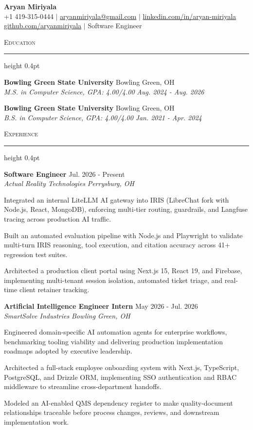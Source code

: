 \documentclass[letterpaper,11pt]{article}
\newcommand{\resumesection}[1]{%
  \par\vspace{2pt}%
  {\large\scshape #1}\par\vspace{2pt}%
  \hrule height 0.4pt\vspace{2pt}%
}
\newcommand{\resumeSubheading}[4]{
  \textbf{#1} \hfill #2\\
  \textit{#3} \hfill \textit{#4}
}
\begin{document}
\begin{center}
  {\LARGE \textbf{Aryan Miriyala}}\\[2pt]
  \small
  +1 419-315-0444 $|$ \href{mailto:aryanmiriyala@gmail.com}{aryanmiriyala@gmail.com} $|$ \href{https://www.linkedin.com/in/aryan-miriyala-7788a21b6/}{linkedin.com/in/aryan-miriyala}\\
  \href{https://github.com/aryanmiriyala}{github.com/aryanmiriyala} $|$ Software Engineer
\end{center}\vspace{-6pt}

\resumesection{Education}
\resumeSubheading
{Bowling Green State University}{Bowling Green, OH}
{M.S. in Computer Science, GPA: 4.00/4.00}{Aug. 2024 - Aug. 2026}

\resumeSubheading
{Bowling Green State University}{Bowling Green, OH}
{B.S. in Computer Science, GPA: 4.00/4.00}{Jan. 2021 - Apr. 2024}

\resumesection{Experience}
\resumeSubheading
{Software Engineer}{Jul. 2026 - Present}
{Actual Reality Technologies}{Perrysburg, OH}
\begin{tightitemize}
  \item Integrated an internal LiteLLM AI gateway into IRIS (LibreChat fork with Node.js, React, MongoDB), enforcing multi-tier routing, guardrails, and Langfuse tracing across production AI traffic.
  \item Built an automated evaluation pipeline with Node.js and Playwright to validate multi-turn IRIS reasoning, tool execution, and citation accuracy across 41+ regression test suites.
  \item Architected a production client portal using Next.js 15, React 19, and Firebase, implementing multi-tenant session isolation, automated ticket triage, and real-time client retainer tracking.
\end{tightitemize}

\resumeSubheading
{Artificial Intelligence Engineer Intern}{May 2026 - Jul. 2026}
{SmartSolve Industries}{Bowling Green, OH}
\begin{tightitemize}
  \item Engineered domain-specific AI automation agents for enterprise workflows, benchmarking tooling viability and delivering production implementation roadmaps adopted by executive leadership.
  \item Architected a full-stack employee onboarding system with Next.js, TypeScript, PostgreSQL, and Drizzle ORM, implementing SSO authentication and RBAC middleware to streamline cross-department handoffs.
  \item Modeled an AI-enabled QMS dependency register to make quality-document relationships traceable before process changes, reviews, and downstream implementation work.
\end{tightitemize}
\end{document}
